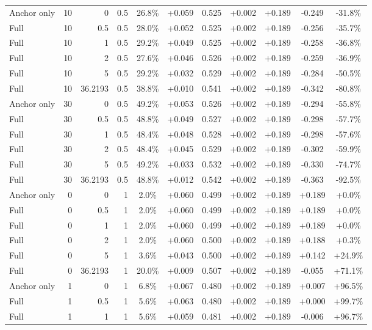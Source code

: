 \begin{table}[htbp]
\begin{tabular}{lrrrccccccc}
Anchor only & 10 & 0 & 0.5 & 26.8\% & +0.059 & 0.525 & +0.002 & +0.189 & -0.249 & -31.8\% \\
Full & 10 & 0.5 & 0.5 & 28.0\% & +0.052 & 0.525 & +0.002 & +0.189 & -0.256 & -35.7\% \\
Full & 10 & 1 & 0.5 & 29.2\% & +0.049 & 0.525 & +0.002 & +0.189 & -0.258 & -36.8\% \\
Full & 10 & 2 & 0.5 & 27.6\% & +0.046 & 0.526 & +0.002 & +0.189 & -0.259 & -36.9\% \\
Full & 10 & 5 & 0.5 & 29.2\% & +0.032 & 0.529 & +0.002 & +0.189 & -0.284 & -50.5\% \\
Full & 10 & 36.2193 & 0.5 & 38.8\% & +0.010 & 0.541 & +0.002 & +0.189 & -0.342 & -80.8\% \\
Anchor only & 30 & 0 & 0.5 & 49.2\% & +0.053 & 0.526 & +0.002 & +0.189 & -0.294 & -55.8\% \\
Full & 30 & 0.5 & 0.5 & 48.8\% & +0.049 & 0.527 & +0.002 & +0.189 & -0.298 & -57.7\% \\
Full & 30 & 1 & 0.5 & 48.4\% & +0.048 & 0.528 & +0.002 & +0.189 & -0.298 & -57.6\% \\
Full & 30 & 2 & 0.5 & 48.4\% & +0.045 & 0.529 & +0.002 & +0.189 & -0.302 & -59.9\% \\
Full & 30 & 5 & 0.5 & 49.2\% & +0.033 & 0.532 & +0.002 & +0.189 & -0.330 & -74.7\% \\
Full & 30 & 36.2193 & 0.5 & 48.8\% & +0.012 & 0.542 & +0.002 & +0.189 & -0.363 & -92.5\% \\
Anchor only & 0 & 0 & 1 & 2.0\% & +0.060 & 0.499 & +0.002 & +0.189 & +0.189 & +0.0\% \\
Full & 0 & 0.5 & 1 & 2.0\% & +0.060 & 0.499 & +0.002 & +0.189 & +0.189 & +0.0\% \\
Full & 0 & 1 & 1 & 2.0\% & +0.060 & 0.499 & +0.002 & +0.189 & +0.189 & +0.0\% \\
Full & 0 & 2 & 1 & 2.0\% & +0.060 & 0.500 & +0.002 & +0.189 & +0.188 & +0.3\% \\
Full & 0 & 5 & 1 & 3.6\% & +0.043 & 0.500 & +0.002 & +0.189 & +0.142 & +24.9\% \\
Full & 0 & 36.2193 & 1 & 20.0\% & +0.009 & 0.507 & +0.002 & +0.189 & -0.055 & +71.1\% \\
Anchor only & 1 & 0 & 1 & 6.8\% & +0.067 & 0.480 & +0.002 & +0.189 & +0.007 & +96.5\% \\
Full & 1 & 0.5 & 1 & 5.6\% & +0.063 & 0.480 & +0.002 & +0.189 & +0.000 & +99.7\% \\
Full & 1 & 1 & 1 & 5.6\% & +0.059 & 0.481 & +0.002 & +0.189 & -0.006 & +96.7\% \\

\end{tabular}
\end{table}
